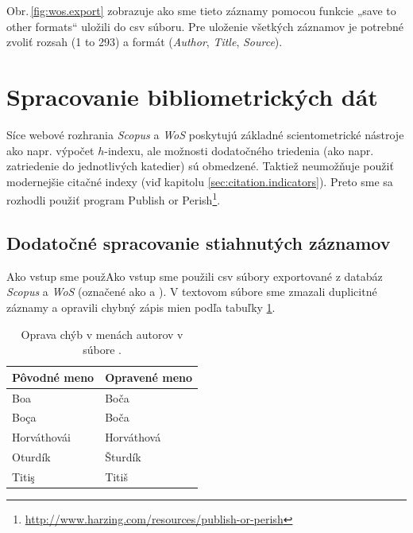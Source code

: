 Obr.\,\ref{fig:wos.export} zobrazuje ako sme tieto záznamy pomocou funkcie „save
to other formats“ uložili do csv súboru. Pre uloženie všetkých záznamov je
potrebné zvoliť rozsah (1 to 293) a formát (\emph{Author}, \emph{Title},
\emph{Source}).


\section{Spracovanie bibliometrických dát}

Síce webové rozhrania \emph{Scopus} a \emph{WoS} poskytujú základné
scientometrické nástroje ako napr. výpočet $h$-indexu, ale možnosti dodatočného
triedenia (ako napr. zatriedenie do jednotlivých katedier) sú obmedzené. Taktiež
neumožňuje použiť modernejšie citačné indexy (viď kapitolu
\ref{sec:citation.indicators}). Preto sme sa rozhodli použiť program Publish or
Perish\footnote{\url{http://www.harzing.com/resources/publish-or-perish}}.


\subsection{Dodatočné spracovanie stiahnutých záznamov}

Ako vstup sme použAko vstup sme použili csv súbory exportované z databáz
\emph{Scopus} a \emph{WoS} (označené ako  a
). V textovom súbore
 sme zmazali duplicitné záznamy a opravili
chybný zápis mien podľa tabuľky \ref{tab:wos.namecorrections}.

\begin{table}
\centering\small
\begin{tabular}{ll}
  \hline\noalign{\vspace{.3ex}}
  Pôvodné meno & Opravené meno \\[0.3ex]
  \hline\noalign{\vspace{.5ex}}
  Boa          & Boča       \\
  Boça         & Boča       \\
  Horváthovái  & Horváthová \\
  Oturdík      & Šturdík    \\
  Titiş        & Titiš      \\[0.5ex]
  \hline
\end{tabular}
\caption{Oprava chýb v menách autorov v súbore .}
\label{tab:wos.namecorrections}
\end{table}

